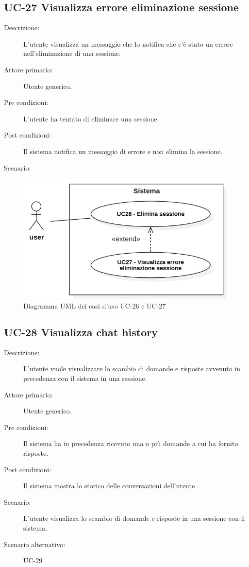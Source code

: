 \subsection{UC-27 Visualizza errore eliminazione sessione }
\begin{description}
    \item[Descrizione:] L'utente visualizza un messaggio che lo notifica che c'è stato un errore nell'eliminazione di una sessione.
    \item[Attore primario:] Utente generico.
    \item[Pre condizioni:] L'utente ha tentato di eliminare una sessione.
    \item[Post condizioni:] Il sistema notifica un messaggio di errore e non elimina la sessione.
    \item[Scenario:] 
\end{description}

\begin{figure}[H]
    \centering
    \includegraphics[width=0.9\linewidth]{UC26-27.PNG}
    \caption{Diagramma UML dei casi d'uso UC-26 e UC-27}
    \label{fig:UC26-27}
\end{figure}

\subsection{UC-28 Visualizza chat history}
\begin{description}
    \item[Descrizione:] L'utente vuole visualizzare lo scambio di domande e risposte avvenuto in precedenza con il sistema in una sessione.
    \item[Attore primario:] Utente generico.
    \item[Pre condizioni:] Il sistema ha in precedenza ricevuto una o più domande a cui ha fornito risposte.
    \item[Post condizioni:] Il sistema mostra lo storico delle conversazioni dell'utente
    \item[Scenario:] L'utente visualizza lo scambio di domande e risposte in una sessione con il sistema.
    \item[Scenario alternativo:] UC-29
\end{description} 

